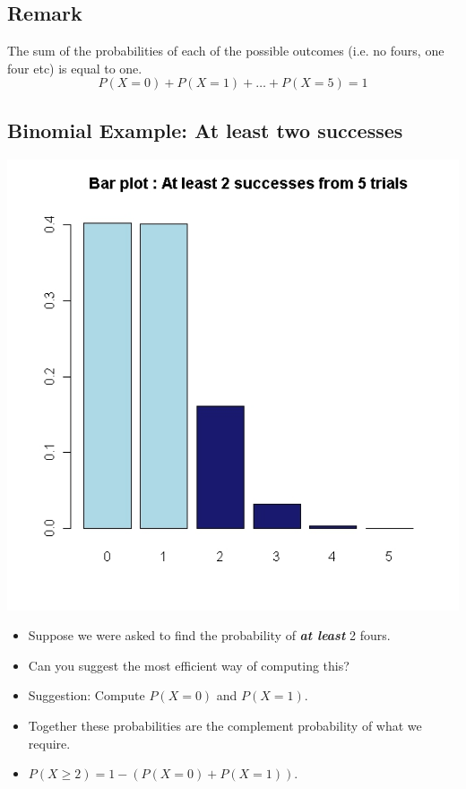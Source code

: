 \subsection*{Remark}  The sum of the probabilities of each of the possible outcomes (i.e. no fours, one four etc) is equal to one.
\[P(X=0) + P(X = 1) + \ldots + P(X=5) = 1 \]


\subsection*{Binomial Example: At least two successes}

\begin{center}
\includegraphics[scale=0.40]{images/3Bbarplot5}
\end{center}


\begin{itemize}
\item Suppose we were asked to find the probability of \textbf{\emph{at least}} 2 fours.
\item Can you suggest the most efficient way of computing this?
\item Suggestion: Compute $P(X=0)$ and $P(X = 1)$.
\item Together these probabilities are the complement probability of what we require.
\item $P(X \geq 2) = 1 - ( P(X=0) + P(X = 1))$.
\end{itemize}
\newpage


